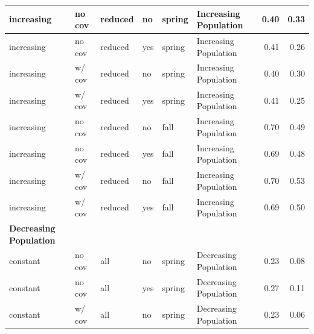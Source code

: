 \documentclass[
  12pt,
]{article}
\begin{document}
\begin{table}
\begin{tabular}{l|l|l|l|l|l|r|r}
\hline
\hspace{1em}\hspace{1em}increasing & no cov & reduced & no & spring & Increasing Population & 0.40 & 0.33\\
\hline
\hspace{1em}\hspace{1em}increasing & no cov & reduced & yes & spring & Increasing Population & 0.41 & 0.26\\
\hline
\hspace{1em}\hspace{1em}increasing & w/ cov & reduced & no & spring & Increasing Population & 0.40 & 0.30\\
\hline
\hspace{1em}\hspace{1em}increasing & w/ cov & reduced & yes & spring & Increasing Population & 0.41 & 0.25\\
\hline
\hspace{1em}\hspace{1em}increasing & no cov & reduced & no & fall & Increasing Population & 0.70 & 0.49\\
\hline
\hspace{1em}\hspace{1em}increasing & no cov & reduced & yes & fall & Increasing Population & 0.69 & 0.48\\
\hline
\hspace{1em}\hspace{1em}increasing & w/ cov & reduced & no & fall & Increasing Population & 0.70 & 0.53\\
\hline
\hspace{1em}\hspace{1em}increasing & w/ cov & reduced & yes & fall & Increasing Population & 0.69 & 0.50\\
\hline
\multicolumn{1}{l}{\textbf{Decreasing Population}}\\
\hline
\hspace{1em}\hspace{1em}constant & no cov & all & no & spring & Decreasing Population & 0.23 & 0.08\\
\hline
\hspace{1em}\hspace{1em}constant & no cov & all & yes & spring & Decreasing Population & 0.27 & 0.11\\
\hline
\hspace{1em}\hspace{1em}constant & w/ cov & all & no & spring & Decreasing Population & 0.23 & 0.06\\

\end{tabular}
\end{table}
\end{document}
